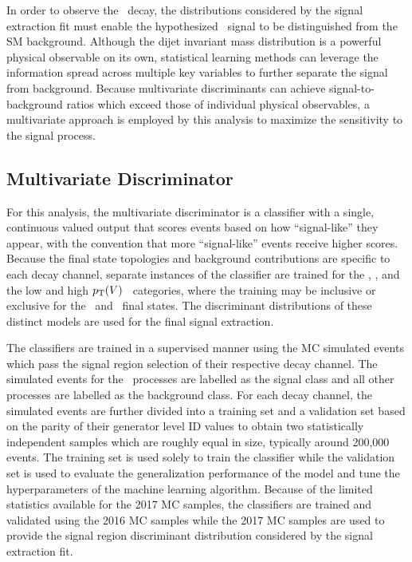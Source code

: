 In order to observe the \VHbb\ decay, the distributions considered by the signal extraction fit must enable the hypothesized \VHbb\ signal to be distinguished from the SM background. Although the dijet invariant mass distribution is a powerful physical observable on its own, statistical learning methods can leverage the information spread across multiple key variables to further separate the signal from background. Because multivariate discriminants can achieve signal-to-background ratios which exceed those of individual physical observables, a multivariate approach is employed by this analysis to maximize the sensitivity to the signal process.

\subsection{Multivariate Discriminator}

For this analysis, the multivariate discriminator is a classifier with a single, continuous valued output that scores events based on how ``signal-like'' they appear, with the convention that more ``signal-like'' events receive higher scores. Because the final state topologies and background contributions are specific to each decay channel, separate instances of the classifier are trained for the \ZnnH, \WlnH, and the low and high $p_{\mathrm{T}}(V)$ \ZllH\ categories, where the training may be inclusive or exclusive for the \lepe\ and \lepm\ final states. The discriminant distributions of these distinct models are used for the final signal extraction.

The classifiers are trained in a supervised manner using the MC simulated events which pass the signal region selection of their respective decay channel. The simulated events for the \VHbb\ processes are labelled as the signal class and all other processes are labelled as the background class. For each decay channel, the simulated events are further divided into a training set and a validation set based on the parity of their generator level ID values to obtain two statistically independent samples which are roughly equal in size, typically around 200,000 events. The training set is used solely to train the classifier while the validation set is used to evaluate the generalization performance of the model and tune the hyperparameters of the machine learning algorithm. Because of the limited statistics available for the 2017 MC samples, the classifiers are trained and validated using the 2016 MC samples while the 2017 MC samples are used to provide the signal region discriminant distribution considered by the signal extraction fit.

